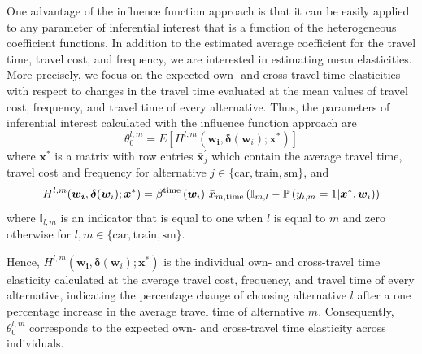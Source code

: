 \documentclass[a4paper, 12pt]{article}
\begin{document}
One advantage of the influence function approach is that it can be easily applied to any parameter of inferential interest that is a function of the heterogeneous coefficient functions. In addition to the estimated average coefficient for the travel time, travel cost, and frequency, we are interested in estimating mean elasticities. More precisely, we focus on the expected own- and cross-travel time elasticities with respect to changes in the travel time evaluated at the mean values of travel cost, frequency, and travel time of every alternative.  Thus, the parameters of inferential interest calculated with the influence function approach are \[\theta_0^{l,m}=E\left[H^{l,m}(\bm{w_i}, \bm{\delta}(\bm{w}_i);\bm{x}^*)\right]\] where  $\bm{x}^{*}$ is a matrix with row entries $\bar{\bm{x}}^{\prime}_j$  which contain the average travel time, travel cost and frequency for alternative $j\in\{\text{car},\text{train},\text{sm}\}$, and 
\begin{equation}
H^{l,m}(\bm{w_i}, \bm{\delta}(\bm{w}_i);\bm{x}^*) =\beta^{\text{time}}\left(\bm{w}_i\right)\,\bar{x}_{m,\text{time}}\left(\mathbb{I}_{m,l}-\mathbb{P}\left(y_{i,m}=1\vert \bm{x}^*, \bm{w}_i\right)\right) \notag
\end{equation}
where $\mathbb{I}_{l,m}$ is an indicator that is equal to one when $l$ is equal to $m$ and zero otherwise for $l,m \in\{\text{car},\text{train},\text{sm}\}$.

Hence, $H^{l,m}(\bm{w_i}, \bm{\delta}(\bm{w}_i);\bm{x}^*)$ is  the individual  own- and cross-travel time elasticity calculated at the average travel cost, frequency, and travel time of every alternative, indicating the percentage change of choosing  alternative $l$ after a one percentage increase in the average travel time of alternative $m$. Consequently, $\theta_0^{l,m}$ corresponds to the expected own- and cross-travel time elasticity across individuals.
\end{document}
